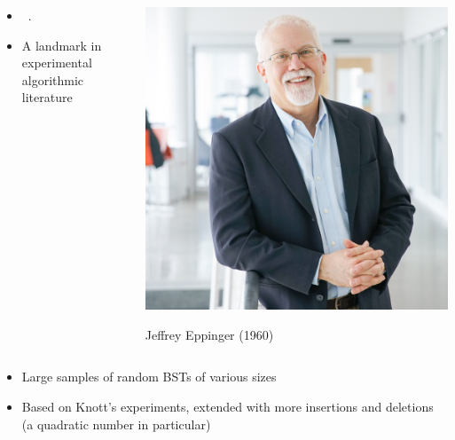 \documentclass{beamer}
\begin{document}
\begin{frame}
    \begin{columns}[c]
        \begin{column}{0.5\textwidth}
            \begin{itemize}
                \item ~.
                \item A landmark in experimental algorithmic literature
            \end{itemize}
        \end{column}
        \begin{column}{0.5\textwidth}
            \includegraphics[width=\textwidth]{eppinger.jpg}
            \begin{center}
                Jeffrey Eppinger (1960)
            \end{center}
        \end{column}
    \end{columns}
\end{frame}


\begin{frame}
    \begin{itemize}
        \item Large samples of random BSTs of various sizes
        \item Based on Knott's experiments, extended with more insertions and deletions (a quadratic number in particular)
    \end{itemize}
\end{frame}
\end{document}
